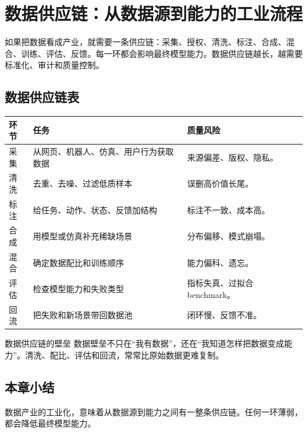 \section{数据供应链：从数据源到能力的工业流程}

如果把数据看成产业，就需要一条供应链：采集、授权、清洗、标注、合成、混合、训练、评估、反馈。每一环都会影响最终模型能力。数据供应链越长，越需要标准化、审计和质量控制。

\subsection{数据供应链表}

\noindent\begin{longtable}{p{}p{}p{}}
\toprule
环节 & 任务 & 质量风险 \\
\midrule
采集 & 从网页、机器人、仿真、用户行为获取数据 & 来源偏差、版权、隐私。 \\
清洗 & 去重、去噪、过滤低质样本 & 误删高价值长尾。 \\
标注 & 给任务、动作、状态、反馈加结构 & 标注不一致、成本高。 \\
合成 & 用模型或仿真补充稀缺场景 & 分布偏移、模式崩塌。 \\
混合 & 确定数据配比和训练顺序 & 能力偏科、遗忘。 \\
评估 & 检查模型能力和失败类型 & 指标失真、过拟合 benchmark。 \\
回流 & 把失败和新场景带回数据池 & 闭环慢、反馈不准。 \\
\bottomrule
\end{longtable}

\begin{knowledgebox}{数据供应链的壁垒}
数据壁垒不只在“我有数据”，还在“我知道怎样把数据变成能力”。清洗、配比、评估和回流，常常比原始数据更难复制。
\end{knowledgebox}

\subsection{本章小结}

数据产业的工业化，意味着从数据源到能力之间有一整条供应链。任何一环薄弱，都会降低最终模型能力。


